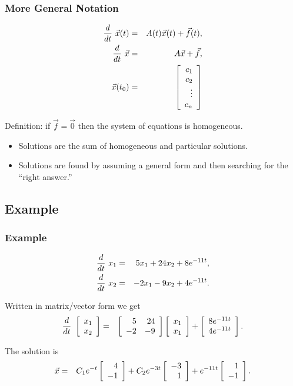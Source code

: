\begin{frame}
  \frametitle{More General Notation}

  \begin{eqnarray*}
    \deriv{~}{t} \vec{x}(t) & = & A(t) \vec{x}(t) + \vec{f}(t), \\
    \deriv{~}{t} \vec{x} & = & A \vec{x} + \vec{f}, \\
    \vec{x}(t_0) & = & 
    \left[
      \begin{array}{r}
        c_1 \\ c_2 \\ \vdots \\ c_n
      \end{array}
    \right]
  \end{eqnarray*}

  Definition: if $\vec{f}=\vec{0}$ then the system of equations is
  homogeneous.

  \begin{itemize}
  \item Solutions are the sum of homogeneous and particular solutions.
  \item Solutions are found by assuming a general form and then
    searching for the ``right answer.''
  \end{itemize}

\end{frame}

\subsection{Example}

\begin{frame}
  \frametitle{Example}

  \begin{eqnarray*}
    \deriv{~}{t} x_1 & = & 5  x_1 + 24 x_2 + 8 e^{-11t}, \\
    \deriv{~}{t} x_2 & = & -2 x_1 -  9 x_2 + 4 e^{-11t}.
  \end{eqnarray*}

  {
    Written in matrix/vector form we get
    \begin{eqnarray*}
      \deriv{~}{t} \vecTwo{x_1}{x_2} & = & 
      \arrayTwo{5}{24}{-2}{-9} \vecTwo{x_1}{x_1}
      + \vecTwo{8e^{-11t}}{4e^{-11t}}.
    \end{eqnarray*}
  }

  {
    The solution is
    \begin{eqnarray*}
      \vec{x} & = & C_1 e^{-t} \vecTwo{4}{-1} 
      + C_2 e^{-3t} \vecTwo{-3}{1} + e^{-11t} \vecTwo{1}{-1}.
    \end{eqnarray*}
  }

\end{frame}


